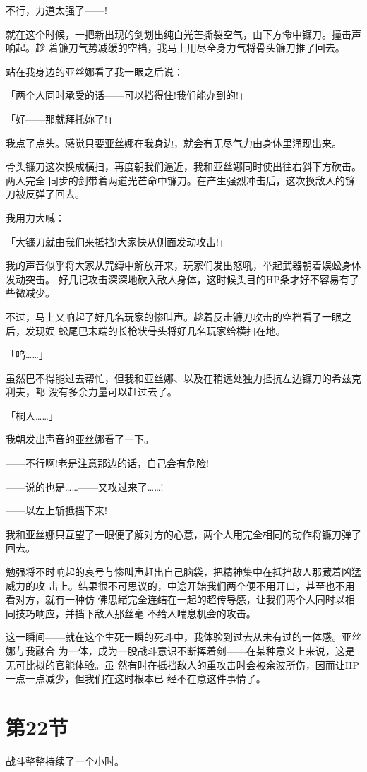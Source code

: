 \documentclass[11pt]{book}
\begin{document}
不行，力道太强了——!

就在这个时候，一把新出现的剑划出纯白光芒撕裂空气，由下方命中镰刀。撞击声响起。趁
着镰刀气势减缓的空档，我马上用尽全身力气将骨头镰刀推了回去。

站在我身边的亚丝娜看了我一眼之后说：

「两个人同时承受的话——可以挡得住!我们能办到的!」

「好——那就拜托妳了!」

我点了点头。感觉只要亚丝娜在我身边，就会有无尽气力由身体里涌现出来。

骨头镰刀这次换成横扫，再度朝我们逼近，我和亚丝娜同时使出往右斜下方砍击。两人完全
同步的剑带着两道光芒命中镰刀。在产生强烈冲击后，这次换敌人的镰刀被反弹了回去。

我用力大喊：

「大镰刀就由我们来抵挡!大家快从侧面发动攻击!」

我的声音似乎将大家从咒缚中解放开来，玩家们发出怒吼，举起武器朝着娱蚣身体发动突击。
好几记攻击深深地砍入敌人身体，这时候头目的HP条才好不容易有了些微减少。

不过，马上又响起了好几名玩家的惨叫声。趁着反击镰刀攻击的空档看了一眼之后，发现娱
蚣尾巴末端的长枪状骨头将好几名玩家给横扫在地。

「呜……」

虽然巴不得能过去帮忙，但我和亚丝娜、以及在稍远处独力抵抗左边镰刀的希兹克利夫，都
没有多余力量可以赶过去了。

「桐人……」

我朝发出声音的亚丝娜看了一下。

——不行啊!老是注意那边的话，自己会有危险!

——说的也是……——又攻过来了……!

——以左上斩抵挡下来!

我和亚丝娜只互望了一眼便了解对方的心意，两个人用完全相同的动作将镰刀弹了回去。

勉强将不时响起的哀号与惨叫声赶出自己脑袋，把精神集中在抵挡敌人那藏着凶猛威力的攻
击上。结果很不可思议的，中途开始我们两个便不用开口，甚至也不用看对方，就有一种仿
佛思绪完全连结在一起的超传导感，让我们两个人同时以相同技巧响应，并挡下敌人那丝毫
不给人喘息机会的攻击。

这一瞬间——就在这个生死一瞬的死斗中，我体验到过去从未有过的一体感。亚丝娜与我融合
为一体，成为一股战斗意识不断挥着剑——在某种意义上来说，这是无可比拟的官能体验。虽
然有时在抵挡敌人的重攻击时会被余波所伤，因而让HP一点一点减少，但我们在这时根本已
经不在意这件事情了。
\section{第22节}
\label{sec:org27357ae}
战斗整整持续了一个小时。
\end{document}
